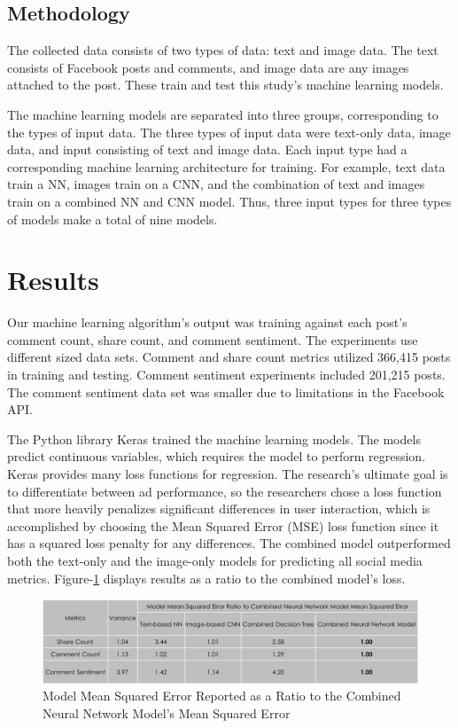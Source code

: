 \documentclass{article}
\begin{document}
\subsection{Methodology}
The collected data consists of two types of data: text and image data. The text consists of Facebook posts and comments, and image data are any images attached to the post. These train and test this study's machine learning models. 

The machine learning models are separated into three groups, corresponding to the types of input data. The three types of input data were text-only data, image data, and input consisting of text and image data. Each input type had a corresponding machine learning architecture for training. For example, text data train a NN, images train on a CNN, and the combination of text and images train on a combined NN and CNN model. Thus, three input types for three types of models make a total of nine models.

\section{Results}
Our machine learning algorithm's output was training against each post's comment count, share count, and comment sentiment. The experiments use different sized data sets.  Comment and share count metrics utilized 366,415 posts in training and testing. Comment sentiment experiments included 201,215 posts. The comment sentiment data set was smaller due to limitations in the Facebook API.

The Python library Keras trained the machine learning models. The models predict continuous variables, which requires the model to perform regression. Keras provides many loss functions for regression.  The research's ultimate goal is to differentiate between ad performance, so the researchers chose a loss function that more heavily penalizes significant differences in user interaction, which is accomplished by choosing the Mean Squared Error (MSE) loss function since it has a squared loss penalty for any differences.  The combined model outperformed both the text-only and the image-only models for predicting all social media metrics.  Figure-\ref{mse_ratios} displays results as a ratio to the combined model's loss. 

\begin{figure}
\centering
\includegraphics[width=\columnwidth]{images/MSE_Results.png}
\caption{Model Mean Squared Error Reported as a Ratio to the Combined Neural Network Model's Mean Squared Error}
\label{mse_ratios}
\end{figure}
\end{document}
